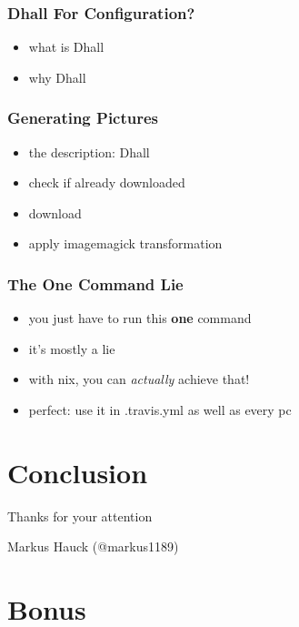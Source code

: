 \documentclass{beamer}
\begin{document}
\begin{frame}
  \frametitle{Dhall For Configuration?}
  \begin{itemize}
  \item what is Dhall
  \item why Dhall
  \end{itemize}
\end{frame}

\begin{frame}
  \frametitle{Generating Pictures}
  \begin{itemize}
  \item the description: Dhall
  \item check if already downloaded
  \item download
  \item apply imagemagick transformation
  \end{itemize}
\end{frame}

\begin{frame}
  \frametitle{The One Command Lie}
  \begin{itemize}
  \item you just have to run this \textbf{one} command
  \item it's mostly a lie
  \item with nix, you can \textit{actually} achieve that!
  \item perfect: use it in .travis.yml as well as every pc
  \end{itemize}
\end{frame}

\section{Conclusion}\label{sec:conclusion}

\begin{frame}
  \begin{center}
    \Huge
    Thanks for your attention
  \end{center}
  \begin{center}
    \Huge
    Markus Hauck (@markus1189)
  \end{center}
\end{frame}

\begin{frame}
  \tableofcontents{}
\end{frame}

\appendix{}

\section*{Bonus}\label{sec:bonus}
\end{document}

